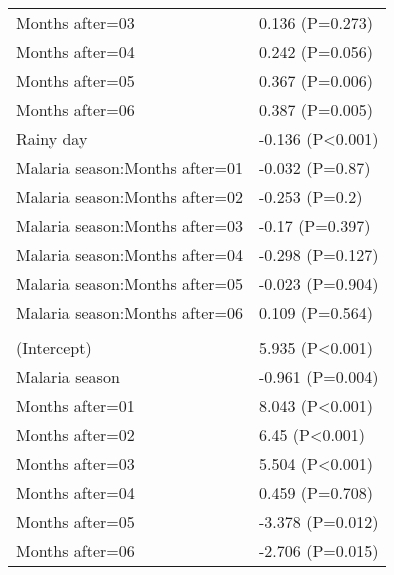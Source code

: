 \documentclass[]{article}
\begin{document}
\begin{longtable}[t]{ll}
\hspace{1em}Months after=03 & 0.136 (P=0.273)\\
\hspace{1em}Months after=04 & 0.242 (P=0.056)\\
\hspace{1em}Months after=05 & 0.367 (P=0.006)\\
\hspace{1em}Months after=06 & 0.387 (P=0.005)\\
\hspace{1em}Rainy day & -0.136 (P<0.001)\\
\hspace{1em}Malaria season:Months after=01 & -0.032 (P=0.87)\\
\hspace{1em}Malaria season:Months after=02 & -0.253 (P=0.2)\\
\hspace{1em}Malaria season:Months after=03 & -0.17 (P=0.397)\\
\hspace{1em}Malaria season:Months after=04 & -0.298 (P=0.127)\\
\hspace{1em}Malaria season:Months after=05 & -0.023 (P=0.904)\\
\hspace{1em}Malaria season:Months after=06 & 0.109 (P=0.564)\\
\addlinespace[1.5em]
\multicolumn{2}{l}{\textbf{Temporary not field worker}}\\
\hspace{1em}(Intercept) & 5.935 (P<0.001)\\
\hspace{1em}Malaria season & -0.961 (P=0.004)\\
\hspace{1em}Months after=01 & 8.043 (P<0.001)\\
\hspace{1em}Months after=02 & 6.45 (P<0.001)\\
\hspace{1em}Months after=03 & 5.504 (P<0.001)\\
\hspace{1em}Months after=04 & 0.459 (P=0.708)\\
\hspace{1em}Months after=05 & -3.378 (P=0.012)\\
\hspace{1em}Months after=06 & -2.706 (P=0.015)\\

\end{longtable}
\end{document}
